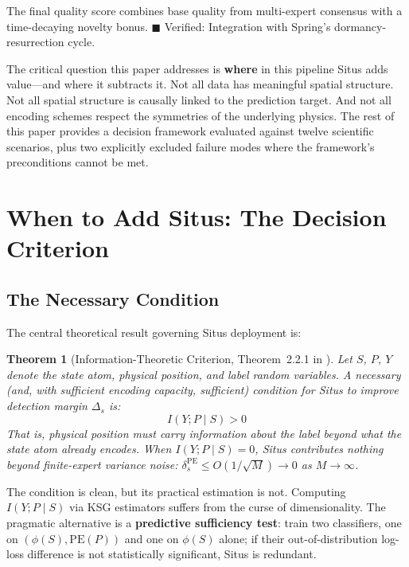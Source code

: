 \documentclass[12pt,a4paper]{article}
\newtheorem{theorem}{Theorem}[section]
\begin{document}
\begin{description}[leftmargin=2cm,style=nextline]
\item[\textbf{Layer 5 — Cercis Score}.] The final quality score combines base quality from multi-expert consensus with a time-decaying novelty bonus. \textcolor{verified}{$\blacksquare$ Verified}: Integration with Spring's dormancy-resurrection cycle.
\end{description}

The critical question this paper addresses is \textbf{where} in this pipeline Situs adds value---and where it subtracts it. Not all data has meaningful spatial structure. Not all spatial structure is causally linked to the prediction target. And not all encoding schemes respect the symmetries of the underlying physics. The rest of this paper provides a decision framework evaluated against twelve scientific scenarios, plus two explicitly excluded failure modes where the framework's preconditions cannot be met.

\section{When to Add Situs: The Decision Criterion}

\subsection{The Necessary Condition}

The central theoretical result governing Situs deployment is:

\begin{theorem}[Information-Theoretic Criterion, Theorem~2.2.1 in \cite{ppe_derivation}]
\label{thm:criterion}
Let $S$, $P$, $Y$ denote the state atom, physical position, and label random variables. A necessary (and, with sufficient encoding capacity, sufficient) condition for Situs to improve detection margin $\Delta_s$ is:
\begin{equation}
\boxed{I(Y; P \mid S) > 0}
\label{eq:criterion}
\end{equation}
That is, physical position must carry information about the label \emph{beyond what the state atom already encodes}. When $I(Y;P \mid S) = 0$, Situs contributes nothing beyond finite-expert variance noise: $\delta_s^{\mathrm{PE}} \leq O(1/\sqrt{M}) \to 0$ as $M \to \infty$.
\end{theorem}

The condition is clean, but its practical estimation is not. Computing $I(Y;P \mid S)$ via KSG estimators suffers from the curse of dimensionality. The pragmatic alternative is a \textbf{predictive sufficiency test}: train two classifiers, one on $(\phi(S), \mathrm{PE}(P))$ and one on $\phi(S)$ alone; if their out-of-distribution log-loss difference is not statistically significant, Situs is redundant.
\end{document}
